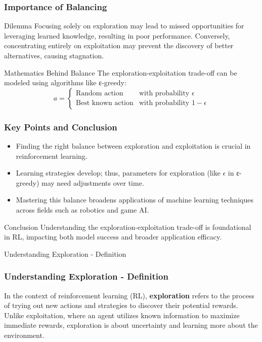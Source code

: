 \documentclass[aspectratio=169]{beamer}
\begin{document}
\begin{frame}[fragile]
    \frametitle{Importance of Balancing}

    \begin{block}{Dilemma}
        Focusing solely on exploration may lead to missed opportunities for leveraging learned knowledge, resulting in poor performance. Conversely, concentrating entirely on exploitation may prevent the discovery of better alternatives, causing stagnation.
    \end{block}
    \begin{block}{Mathematics Behind Balance}
        The exploration-exploitation trade-off can be modeled using algorithms like ε-greedy:
        \begin{equation}
        a = 
        \begin{cases} 
        \text{Random action} & \text{with probability } \epsilon \\
        \text{Best known action} & \text{with probability } 1 - \epsilon 
        \end{cases}
        \end{equation}
    \end{block}
\end{frame}

\begin{frame}[fragile]
    \frametitle{Key Points and Conclusion}

    \begin{itemize}
        \item Finding the right balance between exploration and exploitation is crucial in reinforcement learning.
        \item Learning strategies develop; thus, parameters for exploration (like $\epsilon$ in ε-greedy) may need adjustments over time.
        \item Mastering this balance broadens applications of machine learning techniques across fields such as robotics and game AI.
    \end{itemize}

    \begin{block}{Conclusion}
        Understanding the exploration-exploitation trade-off is foundational in RL, impacting both model success and broader application efficacy.
    \end{block}
\end{frame}

\begin{frame}[fragile]{Understanding Exploration - Definition}
    \frametitle{Understanding Exploration - Definition}
    In the context of reinforcement learning (RL), \textbf{exploration} refers to the process of trying out new actions and strategies to discover their potential rewards. Unlike exploitation, where an agent utilizes known information to maximize immediate rewards, exploration is about uncertainty and learning more about the environment.
\end{frame}
\end{document}
